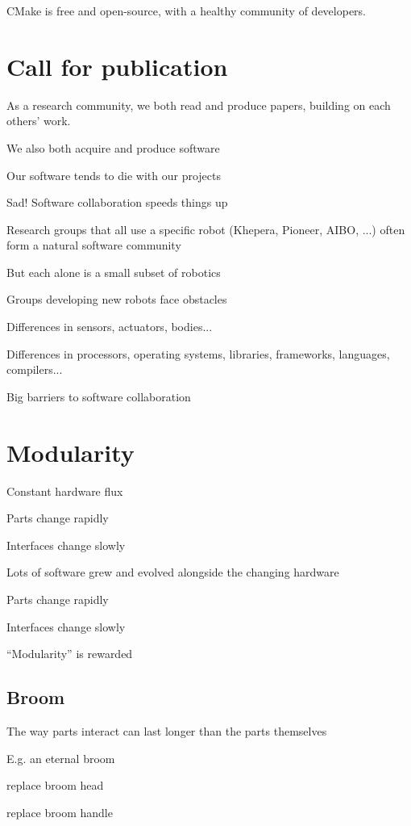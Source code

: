 CMake is free and open-source, with a healthy community of 
developers.



\section{Call for publication}

As a research community, we both read and produce papers, building on
each others' work.

We also both acquire and produce software

Our software tends to die with our projects

Sad!  Software collaboration speeds things up

Research groups that all use a specific robot (Khepera, Pioneer, AIBO,
...) often form a natural software community

But each alone is a small subset of robotics

Groups developing new robots face obstacles

Differences in sensors, actuators, bodies...

Differences in processors, operating systems, libraries, frameworks,
languages, compilers...

Big barriers to software collaboration


\section{Modularity}

Constant hardware flux

Parts change rapidly

Interfaces change slowly

Lots of software grew and evolved alongside the changing hardware

Parts change rapidly

Interfaces change slowly

``Modularity'' is rewarded


\subsection{Broom}

The way parts interact can last longer than the parts themselves

E.g. an eternal broom

replace broom head

replace broom handle


